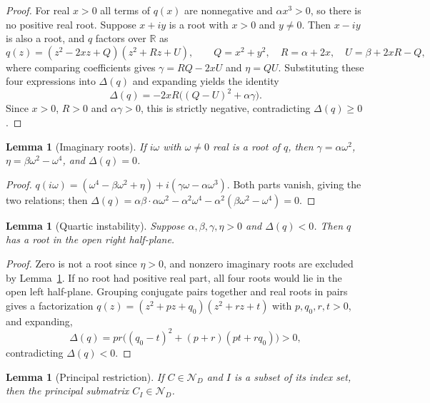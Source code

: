 \documentclass[11pt,a4paper]{article}
\theoremstyle{plain}
\newtheorem{lemma}[theorem]{Lemma}
\theoremstyle{definition}
\theoremstyle{remark}
\newcommand{\R}{\mathbb{R}}
\newcommand{\DN}{\mathcal{N}_D}
\begin{document}
\begin{proof}
For real $x>0$ all terms of $q(x)$ are nonnegative and $\alpha x^3>0$, so there is no positive real root. Suppose $x+iy$ is a root with $x>0$ and $y\ne0$. Then $x-iy$ is also a root, and $q$ factors over $\R$ as
\[
q(z)=(z^2-2xz+Q)(z^2+Rz+U),\qquad Q=x^2+y^2,\quad R=\alpha+2x,\quad U=\beta+2xR-Q,
\]
where comparing coefficients gives $\gamma=RQ-2xU$ and $\eta=QU$. Substituting these four expressions into $\Delta(q)$ and expanding yields the identity
\[
\Delta(q)=-2xR\bigl((Q-U)^2+\alpha\gamma\bigr).
\]
Since $x>0$, $R>0$ and $\alpha\gamma>0$, this is strictly negative, contradicting $\Delta(q)\ge0$.
\end{proof}

\begin{lemma}[Imaginary roots]\label{lem:imag}
If $i\omega$ with $\omega\ne0$ real is a root of $q$, then $\gamma=\alpha\omega^2$, $\eta=\beta\omega^2-\omega^4$, and $\Delta(q)=0$.
\end{lemma}

\begin{proof}
$q(i\omega)=(\omega^4-\beta\omega^2+\eta)+i(\gamma\omega-\alpha\omega^3)$. Both parts vanish, giving the two relations; then $\Delta(q)=\alpha\beta\cdot\alpha\omega^2-\alpha^2\omega^4-\alpha^2(\beta\omega^2-\omega^4)=0$.
\end{proof}

\begin{lemma}[Quartic instability]\label{lem:converse}
Suppose $\alpha,\beta,\gamma,\eta>0$ and $\Delta(q)<0$. Then $q$ has a root in the open right half-plane.
\end{lemma}

\begin{proof}
Zero is not a root since $\eta>0$, and nonzero imaginary roots are excluded by Lemma~\ref{lem:imag}. If no root had positive real part, all four roots would lie in the open left half-plane. Grouping conjugate pairs together and real roots in pairs gives a factorization $q(z)=(z^2+pz+q_0)(z^2+rz+t)$ with $p,q_0,r,t>0$, and expanding,
\[
\Delta(q)=pr\bigl((q_0-t)^2+(p+r)(pt+rq_0)\bigr)>0,
\]
contradicting $\Delta(q)<0$.
\end{proof}

\begin{lemma}[Principal restriction]\label{lem:restriction}
If $C\in\DN$ and $I$ is a subset of its index set, then the principal submatrix $C_I\in\DN$.
\end{lemma}
\end{document}
